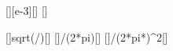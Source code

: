 [\milli\meter][e-3][\meter]
[\Hz]

[]{sqrt(\ncgX/\AX)}[\per\second]
[]{\omX/(2*pi)}[\Hz]
[]{\ncgX/(2*pi*\fbX)^2}[\meter]
